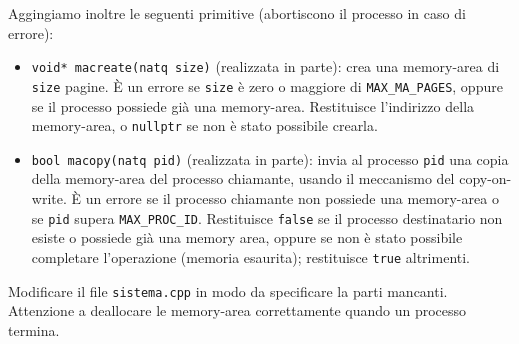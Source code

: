 Aggingiamo inoltre le seguenti primitive (abortiscono il processo in caso di errore):

\begin{itemize}
  \item \verb|void* macreate(natq size)| (realizzata in parte): crea una memory-area di \verb|size| pagine.
    \`E un errore se \verb|size| \`e zero o maggiore di \verb|MAX_MA_PAGES|, oppure se il
    processo possiede gi\`a una memory-area. Restituisce l'indirizzo della memory-area, o \verb|nullptr|
    se non \`e stato possibile crearla.
  \item \verb|bool macopy(natq pid)| (realizzata in parte): invia al processo \verb|pid| una
    copia della memory-area del processo chiamante, usando il meccanismo del copy-on-write.
    \`E un errore se il processo chiamante non possiede una memory-area o se \verb|pid|
    supera \verb|MAX_PROC_ID|\@.
    Restituisce \verb|false| se il processo destinatario non esiste o possiede gi\`a una memory area,
    oppure se non \`e stato possibile completare l'operazione (memoria esaurita); restituisce \verb|true|
    altrimenti.
\end{itemize}

Modificare il file \verb|sistema.cpp| in modo da specificare la parti mancanti. Attenzione a deallocare
le memory-area correttamente quando un processo termina.
